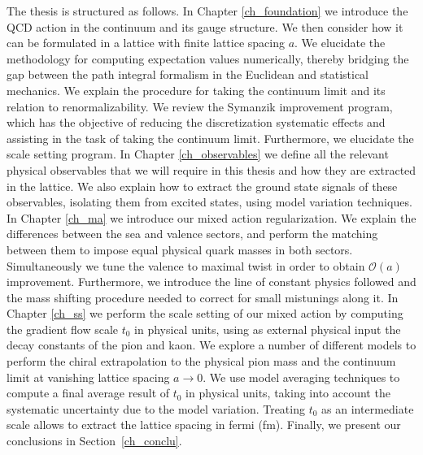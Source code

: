 The thesis is structured as follows. In Chapter \ref{ch_foundation} we introduce the QCD action in the continuum and its gauge structure. We then consider how it can be formulated in a lattice with finite lattice spacing $a$. We elucidate the methodology for computing expectation values numerically, thereby bridging the gap between the path integral formalism in the Euclidean and statistical mechanics. We explain the procedure for taking the continuum limit and its relation to renormalizability. We review the Symanzik improvement program, which has the objective of reducing the discretization systematic effects and assisting in the task of taking the continuum limit. Furthermore, we elucidate the scale setting program. In Chapter \ref{ch_observables} we define all the relevant physical observables that we will require in this thesis and how they are extracted in the lattice. We also explain how to extract the ground state signals of these observables, isolating them from excited states, using model variation techniques. In Chapter \ref{ch_ma} we introduce our mixed action regularization. We explain the differences between the sea and valence sectors, and perform the matching between them to impose equal physical quark masses in both sectors. Simultaneously we tune the valence to maximal twist in order to obtain $\mathcal{O}(a)$ improvement. Furthermore, we introduce the line of constant physics followed and the mass shifting procedure needed to correct for small mistunings along it. In Chapter \ref{ch_ss} we perform the scale setting of our mixed action by computing the gradient flow scale $t_0$ in physical units, using as external physical input the decay constants of the pion and kaon. We explore a number of different models to perform the chiral extrapolation to the physical pion mass and the continuum limit at vanishing lattice spacing $a\to0$. We use model averaging techniques to compute a final average result of $t_0$ in physical units, taking into account the systematic uncertainty due to the model variation. Treating $t_0$ as an intermediate scale allows to extract the lattice spacing in fermi (fm). Finally, we present our conclusions in Section~\ref{ch_conclu}.

